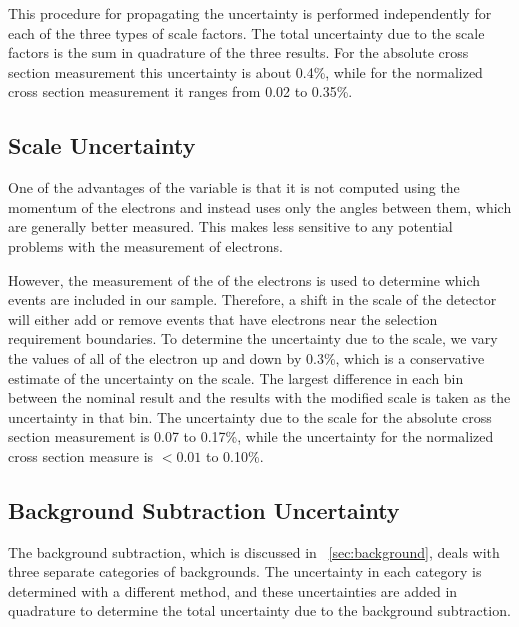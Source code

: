 This procedure for propagating the uncertainty is performed independently for
each of the three types of scale factors. The total uncertainty due to the
scale factors is the sum in quadrature of the three results. For the absolute
cross section measurement this uncertainty is about 0.4\%, while for the
normalized cross section measurement it ranges from 0.02 to 0.35\%.

\subsection{\texorpdfstring{\pt}{PT} Scale Uncertainty}
\label{ssec:pt_scale_uncertainty}

One of the advantages of the \phistar variable is that it is not computed using
the momentum of the electrons and instead uses only the angles between them,
which are generally better measured. This makes \phistar less sensitive to any
potential problems with the \pt measurement of electrons.

However, the measurement of the \pt of the electrons is used to determine which
events are included in our sample. Therefore, a shift in the \pt scale of the
detector will either add or remove events that have electrons near the \pt
selection requirement boundaries. To determine the uncertainty due to the \pt
scale, we vary the \pt values of all of the electron up and down by 0.3\%,
which is a conservative estimate of the uncertainty on the \pt scale. The
largest difference in each \phistar bin between the nominal result and the
results with the modified \pt scale is taken as the uncertainty in that bin.
The uncertainty due to the \pt scale for the absolute cross section measurement
is 0.07 to 0.17\%, while the uncertainty for the normalized cross section
measure is $< 0.01$ to 0.10\%.

\subsection{Background Subtraction Uncertainty}
\label{ssec:background_subtraction_uncertainty}

The background subtraction, which is discussed in \SEC~\ref{sec:background},
deals with three separate categories of backgrounds. The uncertainty in
each category is determined with a different method, and these uncertainties
are added in quadrature to determine the total uncertainty due to the
background subtraction.

